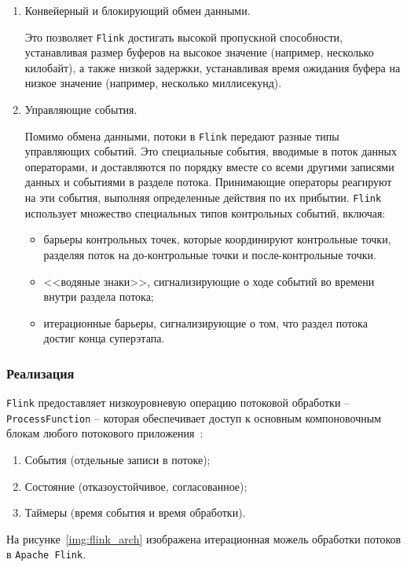 \begin{enumerate}
  \item Конвейерный и блокирующий обмен данными.

    Это позволяет \texttt{Flink} достигать высокой пропускной способности, устанавливая размер буферов на высокое значение (например, несколько килобайт), а также низкой задержки, устанавливая время ожидания буфера на низкое значение (например, несколько миллисекунд).
  \item Управляющие события.

    Помимо обмена данными, потоки в \texttt{Flink} передают разные типы управляющих событий. 
    Это специальные события, вводимые в поток данных операторами, и доставляются по порядку вместе со всеми другими записями данных и событиями в разделе потока. 
    Принимающие операторы реагируют на эти события, выполняя определенные действия по их прибытии. 
    \texttt{Flink} использует множество специальных типов контрольных событий, включая:
    \begin{itemize}
      \item барьеры контрольных точек, которые координируют контрольные точки, разделяя поток на до-контрольные точки и после-контрольные точки.
      \item <<водяные знаки>>, сигнализирующие о ходе событий во времени внутри раздела потока;
      \item итерационные барьеры, сигнализирующие о том, что раздел потока достиг конца суперэтапа.
    \end{itemize}
\end{enumerate}

\subsubsection{Реализация}

\texttt{Flink} предоставляет низкоуровневую операцию потоковой обработки -- \texttt{ProcessFunction} -- которая обеспечивает доступ к основным компоновочным блокам любого потокового приложения~\cite{flink-oreilly}:
\begin{enumerate}
  \item События (отдельные записи в потоке);
  \item Состояние (отказоустойчивое, согласованное);
  \item Таймеры (время события и время обработки).
\end{enumerate}

На рисунке~\ref{img:flink_arch} изображена итерационная можель обработки потоков в \texttt{Apache Flink}.

